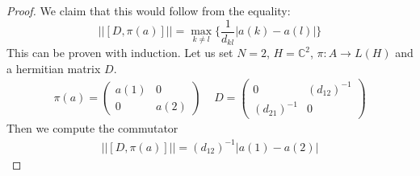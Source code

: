 \begin{proof}
    We claim that this would follow from the equality:
    \begin{equation}
        \big|\big|[D, \pi(a)]\big|\big| = \max_{k\neq l}
        \bigg\{\frac{1}{d_{kl}}\big|a(k) - a(l)\big|\bigg\}
        \label{induction}
    \end{equation}
    This can be proven with induction. Let us set $N=2$,
    $H=\mathbb{C}^2$, $\pi:A\rightarrow L(H)$ and a hermitian matrix $D$.
    \begin{align}
        \pi(a) =
        \begin{pmatrix}
            a(1) & 0 \\
            0 & a(2)
        \end{pmatrix}
        \;\;\;\;
        D =
        \begin{pmatrix}
            0 & (d_{12})^{-1} \\
            (d_{21})^{-1} & 0
        \end{pmatrix}
    \end{align}
    Then we compute the commutator
    \begin{align}
        \big|\big|[D, \pi(a)]\big|\big| = (d_{12})^{-1} \big| a(1) - a(2)\big|
    \end{align}


\end{proof}
